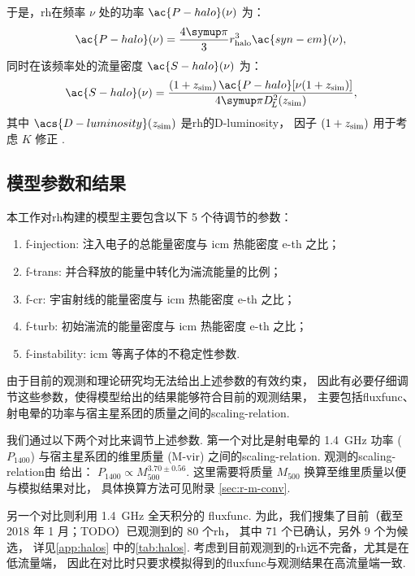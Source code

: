 于是，\ac{rh}在频率 $\nu$ 处的功率 $\ac{P-halo}(\nu)$ 为：
\begin{equation}
  \label{eq:halo-power}
  \ac{P-halo}(\nu) = \frac{4\Cpi}{3} r_{\R{halo}}^3 \ac{syn-em}(\nu) ,
\end{equation}
同时在该频率处的流量密度 $\ac{S-halo}(\nu)$ 为：
\begin{equation}
  \label{eq:halo-flux}
  \ac{S-halo}(\nu) =
    \frac{(1+z_{\R{sim}}) \,\ac{P-halo}[\nu(1+z_{\R{sim}})]}{
      4\Cpi D_{\!L}^2(z_{\R{sim}})} ,
\end{equation}
其中
$\acs{D-luminosity}(z_{\R{sim}})$ 是\ac{rh}的\acl{D-luminosity}，
因子 $(1 + z_{\mathrm{sim}})$ 用于考虑 $K$ 修正 \cite{hogg1999}.

\subsection{模型参数和结果}
\label{sec:halo-results}

本工作对\ac{rh}构建的模型主要包含以下 5 个待调节的参数：
\begin{enumerate}
  \item \ac{f-injection}:
    注入电子的总能量密度与 \ac{icm} 热能密度 \ac{e-th} 之比；
  \item \ac{f-trans}:
    并合释放的能量中转化为湍流能量的比例；
  \item \ac{f-cr}:
    宇宙射线的能量密度与 \ac{icm} 热能密度 \ac{e-th} 之比；
  \item \ac{f-turb}:
    初始湍流的能量密度与 \ac{icm} 热能密度 \ac{e-th} 之比；
  \item \ac{f-instability}:
    \ac{icm} 等离子体的不稳定性参数.
\end{enumerate}
由于目前的观测和理论研究均无法给出上述参数的有效约束，
因此有必要仔细调节这些参数，使得模型给出的结果能够符合目前的观测结果，
主要包括\ac{fluxfunc}、射电晕的功率与宿主星系团的质量之间的\ac{scaling-relation}.

我们通过以下两个对比来调节上述参数.
第一个对比是射电晕的 \SI{1.4}{\GHz} 功率 ($P_{1400}$)
与宿主星系团的维里质量 (\ac{M-vir}) 之间的\ac{scaling-relation}.
观测的\ac{scaling-relation}由  给出：
$P_{1400} \propto M_{500}^{3.70 \pm 0.56}$.
这里需要将质量 $M_{500}$ 换算至维里质量以便与模拟结果对比，
具体换算方法可见附录 \autoref{sec:r-m-conv}.

另一个对比则利用 \SI{1.4}{\GHz} 全天积分的 \ac{fluxfunc}.
为此，我们搜集了目前（截至 2018 年 1 月；TODO）已观测到的 80 个\ac{rh}，
其中 71 个已确认，另外 9 个为候选，
详见\autoref{app:halos} 中的\autoref{tab:halos}.
考虑到目前观测到的\ac{rh}远不完备，尤其是在低流量端，
因此在对比时只要求模拟得到的\ac{fluxfunc}与观测结果在高流量端一致.

